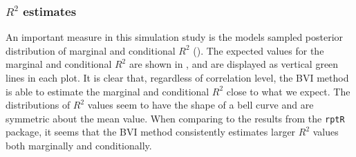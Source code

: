 \subsubsection{$R^2$ estimates}
An important measure in this simulation study is the models sampled posterior distribution of marginal and conditional $R^2$ (). The expected values for the marginal and conditional $R^2$ are shown in , and are displayed as vertical green lines in each plot. It is clear that, regardless of correlation level, the BVI method is able to estimate the marginal and conditional $R^2$ close to what we expect. The distributions of $R^2$ values seem to have the shape of a bell curve and are symmetric about the mean value. When comparing to the results from the \texttt{rptR} package, it seems that the BVI method consistently estimates larger $R^2$ values both marginally and conditionally. 

